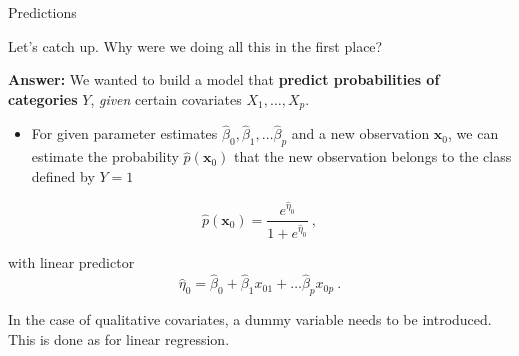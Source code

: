 \documentclass[10pt,ignorenonframetext,]{beamer}
\providecommand{\tightlist}{%
  \setlength{\itemsep}{0pt}\setlength{\parskip}{0pt}}
\begin{document}
\begin{frame}

\begin{block}{Predictions}

\vspace{2mm}

Let's catch up. Why were we doing all this in the first place?

\vspace{2mm}

\textbf{Answer:} We wanted to build a model that \textbf{predict
probabilities of categories} \(Y\), \emph{given} certain covariates
\(X_1, \ldots, X_p\).

\vspace{2mm}

\begin{itemize}
\tightlist
\item
  For given parameter estimates
  \(\hat\beta_0, \hat\beta_1, \ldots \hat\beta_p\) and a new observation
  \({\boldsymbol x}_0\), we can estimate the probability
  \(\hat{p}({\boldsymbol x}_0)\) that the new observation belongs to the
  class defined by \(Y=1\)
\end{itemize}

\[\hat{p}({\boldsymbol x}_0) = \frac{e^{\hat{\eta}_0}}{1+e^{\hat{\eta}_0}} \ , \]

with linear predictor
\[\hat\eta_0 = \hat\beta_0 + \hat\beta_1 x_{01} + \ldots \hat\beta_p x_{0p} \ .\]

In the case of qualitative covariates, a dummy variable needs to be
introduced. This is done as for linear regression.

\end{block}

\end{frame}
\end{document}
